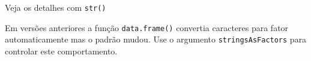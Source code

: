 \documentclass[
  10pt,
  a4paper]{book}
\newenvironment{Shaded}{\begin{snugshade}}{\end{snugshade}}
\newcommand{\DecValTok}[1]{\textcolor[rgb]{0.00,0.00,0.81}{#1}}
\newcommand{\ErrorTok}[1]{\textcolor[rgb]{0.64,0.00,0.00}{\textbf{#1}}}
\newcommand{\FunctionTok}[1]{\textcolor[rgb]{0.00,0.00,0.00}{#1}}
\newcommand{\NormalTok}[1]{#1}
\newcommand{\SpecialCharTok}[1]{\textcolor[rgb]{0.00,0.00,0.00}{#1}}
\newcommand{\StringTok}[1]{\textcolor[rgb]{0.31,0.60,0.02}{#1}}
\begin{document}
Veja os detalhes com \texttt{str()}

\begin{Shaded}
\end{Shaded}

Em versões anteriores a função \texttt{data.frame()} convertia caracteres para fator
automaticamente mas o padrão mudou. Use o argumento \texttt{stringsAsFactors} para controlar este comportamento.
\end{document}
